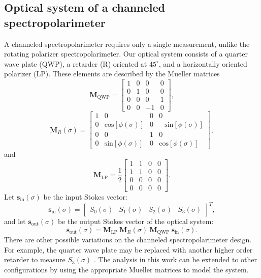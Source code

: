 \documentclass[10pt]{article}
\numberwithin{equation}{subsection}
\newcommand{\lbf}[1]{\ensuremath{{\boldsymbol #1}}}
\begin{document}
\subsection{Optical system of a channeled spectropolarimeter}
A channeled spectropolarimeter requires only a single measurement, unlike the rotating polarizer spectropolarimeter.
Our optical system consists of a quarter wave plate (QWP), a retarder (R) oriented at $45^\circ$, and a horizontally oriented polarizer (LP).
These elements are described by the Mueller matrices
%
\begin{equation}
\lbf{M}_{\text{QWP}}= \left[
\begin{array}{cccc}
1 & 0 & 0 & 0\\
0 & 1 & 0 & 0\\
0 & 0 & 0 & 1\\
0 & 0 & -1 & 0
\end{array}
\right],
\end{equation}
%
\begin{equation}
\lbf{M}_{R}(\sigma) = \left[
\begin{array}{cccc}
1 & 0 & 0 & 0\\
    0 & \text{cos}[\phi(\sigma)] & 0 & -\text{sin}[\phi(\sigma)]\\
0 & 0 & 1 & 0\\
0 & \text{sin}[\phi(\sigma)] & 0 & \text{cos}[\phi(\sigma)]
\end{array}
\right],
\end{equation}
%
and
%
\begin{equation}
    \lbf{M}_{\text{LP}} = \frac{1}{2} \left[
\begin{array}{cccc}
1 & 1 & 0 & 0\\
1 & 1 & 0 & 0\\
0 & 0 & 0 & 0\\
0 & 0 & 0 & 0
\end{array}
\right].
\end{equation}
%
Let $\lbf s_{\text{in}}(\sigma)$ be the input Stokes vector:
\begin{equation}
\lbf s_{\text{in}}(\sigma) = \left[
\begin{array}{cccc}
S_0(\sigma)
 & S_1(\sigma)
 & S_2(\sigma)
& S_3(\sigma)
\end{array}
\right]^T,
\end{equation}
%
and let $\lbf s_{\text{out}}(\sigma)$ be the output Stokes vector of the optical system:
%
\begin{equation}
\lbf s_{\text{out}}(\sigma) = \lbf{M}_{\text{LP}}
~\lbf{M}_{R}(\sigma)
~\lbf{M}_{\text{QWP}} ~\lbf s_{\text{in}}(\sigma).
\end{equation}
%
There are other possible variations on the channeled spectropolarimeter design.
For example, the quarter wave plate may be replaced with another higher order retarder to measure $S_3(\sigma)$ \cite{Oka99}.
The analysis in this work can be extended to other configurations by using the appropriate Mueller matrices to model the system.
%
\end{document}

